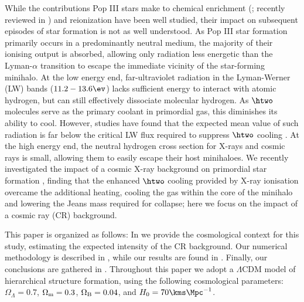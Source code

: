 While the contributions Pop III stars make to chemical enrichment (\citealt{MadauFerraraRees2001, MoriFerraraMadau2002, BrommYoshidaHernquist2003, Hegeretal2003, UmedaNomoto2003, TornatoreFerraraSchneider2007, Greifetal2007, Greifetal2010, WiseAbel2008, Maioetal2011}; recently reviewed in \citealt{KarlssonBrommHawthorn2013}) and reionization \citep{Kitayamaetal2004, Sokasianetal2004, WhalenAbelNorman2004, AlvarezBrommShapiro2006, JohnsonGreifBromm2007, Robertsonetal2010} have been well studied, their impact on subsequent episodes of star formation is not as well understood.  As Pop III star formation primarily occurs in a predominantly neutral medium, the majority of their ionising output is absorbed, allowing only radiation less energetic than the Lyman-$\alpha$ transition to escape the immediate vicinity of the star-forming minihalo.  At the low energy end, far-ultraviolet radiation in the Lyman-Werner (LW) bands ($11.2 - 13.6\ev$) lacks sufficient energy to interact with atomic hydrogen, but can still effectively dissociate molecular hydrogen.  As $\htwo$ molecules serve as the primary coolant in primordial gas, this diminishes its ability to cool.  However, studies have found that the expected mean value of such radiation is far below the critical LW flux required to suppress $\htwo$ cooling \citep{Dijkstraetal2008}. At the high energy end, the neutral hydrogen cross section for X-rays and cosmic rays is small, allowing them to easily escape their host minihaloes.  We recently investigated the impact of a cosmic X-ray background on primordial star formation \citep{Hummeletal2014}, finding that the enhanced $\htwo$ cooling provided by X-ray ionisation overcame the additional heating, cooling the gas within the core of the minihalo and lowering the Jeans mass required for collapse; here we focus on the impact of a cosmic ray (CR) background.  

This paper is organized as follows: In  we provide the cosmological context for this study, estimating the expected intensity of the CR background. Our numerical methodology is described in , while our results are found in .  Finally, our conclusions are gathered in .
Throughout this paper we adopt a $\Lambda$CDM model of hierarchical structure formation, using the following cosmological parameters: $\Omega_{\Lambda} = 0.7$, $\Omega_{\rm m} = 0.3$, $\Omega_{\rm B} = 0.04$, and $H_0 = 70 \kms \Mpc^{-1}$.